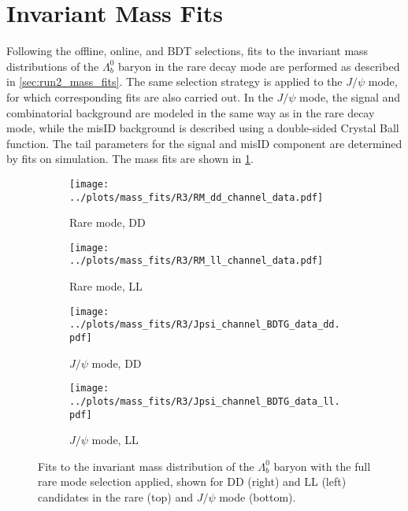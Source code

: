 \section{Invariant Mass Fits}
\label{sec:run3_mass_fits}
Following the offline, online, and BDT selections, fits to the invariant mass distributions of the $\Lambda_b^0$ baryon in the rare decay mode are performed as described in \cref{sec:run2_mass_fits}. The same selection strategy is applied to the $J/\psi$ mode, for which corresponding fits are also carried out. In the $J/\psi$ mode, the signal and combinatorial background are modeled in the same way as in the rare decay mode, while the misID background is described using a double-sided Crystal Ball function. The tail parameters for the signal and misID component are determined by fits on simulation. The mass fits are shown in \cref{fig:run3_mass_fits_combined}.
\begin{figure}[htbp]
    \centering
    \begin{subfigure}[b]{0.48\textwidth}
        \centering
        \texttt{[image: ../plots/mass\_fits/R3/RM\_dd\_channel\_data.pdf]}
        \caption{Rare mode, DD}
    \end{subfigure}
    \hfill
    \begin{subfigure}[b]{0.48\textwidth}
        \centering
        \texttt{[image: ../plots/mass\_fits/R3/RM\_ll\_channel\_data.pdf]}
        \caption{Rare mode, LL}
    \end{subfigure}
    
    \begin{subfigure}[b]{0.48\textwidth}
        \centering
        \texttt{[image: ../plots/mass\_fits/R3/Jpsi\_channel\_BDTG\_data\_dd.pdf]}
        \caption{$J/\psi$ mode, DD}
    \end{subfigure}
    \hfill
    \begin{subfigure}[b]{0.48\textwidth}
        \centering
        \texttt{[image: ../plots/mass\_fits/R3/Jpsi\_channel\_BDTG\_data\_ll.pdf]}
        \caption{$J/\psi$ mode, LL}
    \end{subfigure}

    \caption{Fits to the invariant mass distribution of the $\Lambda_b^0$ baryon with the full rare mode selection applied, shown for DD (right) and LL (left) candidates in the rare (top) and $J/\psi$ mode (bottom).}
    \label{fig:run3_mass_fits_combined}
\end{figure}

